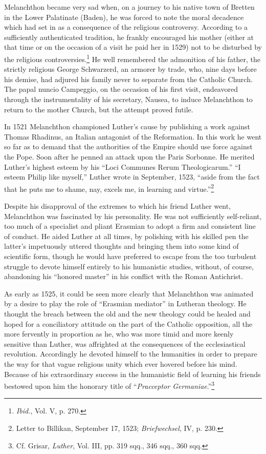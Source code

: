 Melanchthon became very sad when, on a journey to his native
town of Bretten in the Lower Palatinate (Baden), he was forced
to note the moral decadence which had set in as a consequence of
the religious controversy. According to a sufficiently authenticated
tradition, he frankly encouraged his mother (either at that time or
on the occasion of a visit he paid her in 1529) not to be disturbed
by the religious controversies.\footnote{\textit{Ibid.}, Vol. V, p. 270.}
He well remembered the admonition of
his father, the strictly religious George Schwarzerd, an
armorer by trade, who, nine days before his demise, had adjured
his family never to separate from the Catholic Church. The papal
nuncio Campeggio, on the occasion of his first visit, endeavored
through the instrumentality of his secretary, Nausea, to induce
Melanchthon to return to the mother Church, but the attempt proved
futile.

In 1521 Melanchthon championed Luther’s cause by publishing
a work against Thomas Rhadinus, an Italian antagonist of the
Reformation. In this work he went so far as to demand that the
authorities of the Empire should use force against the Pope. Soon
after he penned an attack upon the Paris Sorbonne. He merited
Luther’s highest esteem by his “Loci Communes Rerum Theologicarum.” “I
esteem Philip like myself,” Luther wrote in September,
1523, “aside from the fact that he puts me to shame, nay, excels me,
in learning and virtue.”\footnote
{Letter to Billikan, September 17, 1523; \textit{Briefwechsel}, IV, p. 230.}

Despite his disapproval of the extremes to which his friend Luther
went, Melanchthon was fascinated by his personality. He was not
sufficiently self-reliant, too much of a specialist and pliant Erasmian
to adopt a firm and consistent line of conduct. He aided Luther
at all times, by polishing with his skilled pen the latter’s impetuously
uttered thoughts and bringing them into some kind of scientific
form, though he would have preferred to escape from the too turbulent
struggle to devote himself entirely to his humanistic studies, without,
of course, abandoning his “honored master” in his conflict
with the Roman Antichrist.

As early as 1525, it could be seen more clearly that Melanchthon
was animated by a desire to play the role of “Erasmian mediator”
in Lutheran theology. He thought the breach between the old and
the new theology could be healed and hoped for a conciliatory attitude
on the part of the Catholic opposition, all the more fervently
in proportion as he, who was more timid and more keenly sensitive
than Luther, was affrighted at the consequences of the ecclesiastical
revolution. Accordingly he devoted himself to the humanities in order
to prepare the way for that vague religious unity which ever hovered
before his mind. Because of his extraordinary success in the humanistic
field of learning his friends bestowed upon him the honorary title
of “\textit{Pracceptor Germaniae}.”\footnote
{Cf. Grisar, \textit{Luther}, Vol. III, pp. 319 sqq., 346 sqq., 360 sqq.}

